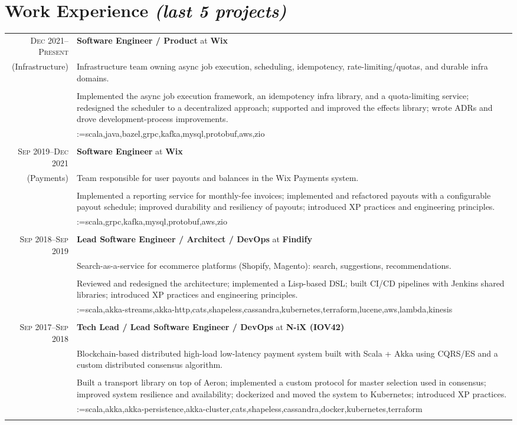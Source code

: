 \documentclass[a4paper,11pt]{article}
\makeatletter
\newcommand{\sotag}[1]{\tikz[baseline]{\node[anchor=base, rounded corners=0.5ex, text height=1.5ex, text depth=.25ex, fill=tagbg, draw=tagbg, text=tagtxt] {#1};}}
\newcommand{\sotagrow}[1]{\\[0.35em]& \@for\sotagitem:=#1\do{\sotag{\sotagitem} }\\}
\newcommand{\job}[2]{\large\sffamily \textbf{#1} at \textbf{#2}\rule[-0.45em]{0pt}{1.45em}}
\newcommand{\sep}{\multicolumn{2}{c}{}\\}
\makeatother
\begin{document}
\section{Work Experience \hfill{\normalfont\footnotesize\itshape (last 5 projects)}}
\begin{longtable}{r|p{}}

  \textsc{Dec 2021--Present} & \job{Software Engineer / Product}{Wix} \\(Infrastructure)
    &Infrastructure team owning async job execution, scheduling, idempotency, rate-limiting/quotas, and durable infra domains.\\&\\
    &Implemented the async job execution framework, an idempotency infra library, and a quota-limiting service; redesigned the scheduler to a decentralized approach; supported and improved the effects library; wrote ADRs and drove development-process improvements.\sotagrow{scala,java,bazel,grpc,kafka,mysql,protobuf,aws,zio}\sep

  \textsc{Sep 2019--Dec 2021} & \job{Software Engineer}{Wix} \\(Payments)
    &Team responsible for user payouts and balances in the Wix Payments system.\\&\\
    &Implemented a reporting service for monthly-fee invoices; implemented and refactored payouts with a configurable payout schedule; improved durability and resiliency of payouts; introduced XP practices and engineering principles.\sotagrow{scala,grpc,kafka,mysql,protobuf,aws,zio}\sep

  \textsc{Sep 2018--Sep 2019} & \job{Lead Software Engineer / Architect / DevOps}{Findify} \\
    &Search-as-a-service for ecommerce platforms (Shopify, Magento): search, suggestions, recommendations.\\&\\
    &Reviewed and redesigned the architecture; implemented a Lisp-based DSL; built CI/CD pipelines with Jenkins shared libraries; introduced XP practices and engineering principles.\sotagrow{scala,akka-streams,akka-http,cats,shapeless,cassandra,kubernetes,terraform,lucene,aws,lambda,kinesis}\sep

  \textsc{Sep 2017--Sep 2018} & \job{Tech Lead / Lead Software Engineer / DevOps}{N-iX (IOV42)} \\
    &Blockchain-based distributed high-load low-latency payment system built with Scala + Akka using CQRS/ES and a custom distributed consensus algorithm.\\&\\
    &Built a transport library on top of Aeron; implemented a custom protocol for master selection used in consensus; improved system resilience and availability; dockerized and moved the system to Kubernetes; introduced XP practices.\sotagrow{scala,akka,akka-persistence,akka-cluster,cats,shapeless,cassandra,docker,kubernetes,terraform}\sep


\end{longtable}
\end{document}
